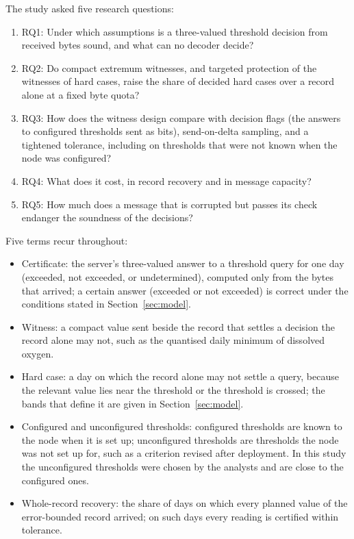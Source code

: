 The study asked five research questions:
\begin{enumerate}
  \item RQ1: Under which assumptions is a three-valued threshold decision from received bytes sound, and what can no decoder decide?
  \item RQ2: Do compact extremum witnesses, and targeted protection of the witnesses of hard cases, raise the share of decided hard cases over a record alone at a fixed byte quota?
  \item RQ3: How does the witness design compare with decision flags (the answers to configured thresholds sent as bits), send-on-delta sampling, and a tightened tolerance, including on thresholds that were not known when the node was configured?
  \item RQ4: What does it cost, in record recovery and in message capacity?
  \item RQ5: How much does a message that is corrupted but passes its check endanger the soundness of the decisions?
\end{enumerate}

Five terms recur throughout:
\begin{itemize}
  \item Certificate: the server's three-valued answer to a threshold query for one day (exceeded, not exceeded, or undetermined), computed only from the bytes that arrived; a certain answer (exceeded or not exceeded) is correct under the conditions stated in Section~\ref{sec:model}.
  \item Witness: a compact value sent beside the record that settles a decision the record alone may not, such as the quantised daily minimum of dissolved oxygen.
  \item Hard case: a day on which the record alone may not settle a query, because the relevant value lies near the threshold or the threshold is crossed; the bands that define it are given in Section~\ref{sec:model}.
  \item Configured and unconfigured thresholds: configured thresholds are known to the node when it is set up; unconfigured thresholds are thresholds the node was not set up for, such as a criterion revised after deployment. In this study the unconfigured thresholds were chosen by the analysts and are close to the configured ones.
  \item Whole-record recovery: the share of days on which every planned value of the error-bounded record arrived; on such days every reading is certified within tolerance.
\end{itemize}

